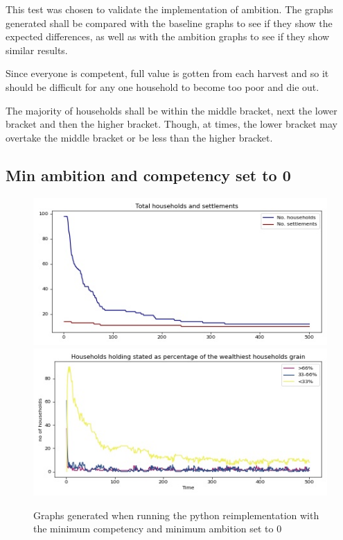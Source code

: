\documentclass[12pt]{article}
\begin{document}
				This test was chosen to validate the implementation of ambition. The graphs generated shall be compared with the baseline graphs to see if they show the expected differences, as well as with the ambition graphs to see if they show similar results.
		
				Since everyone is competent, full value is gotten from each harvest and so it should be difficult for any one household to become too poor and die out.
		
				The majority of households shall be within the middle bracket, next the lower bracket and then the higher bracket. Though, at times, the lower bracket may overtake the middle bracket or be less than the higher bracket.
		
		
		
			\subsection{Min ambition and competency set to 0}
				\begin{figure}[!htb]
				\includegraphics[width=12cm]{Min_ambition_competency_run1_A}\\
				\includegraphics[width=12cm]{Min_ambition_competency_run1_B}
				\caption{Graphs generated when running the python reimplementation with the minimum competency and minimum ambition set to 0}
				\label{fig:Min_ambition_competency_ours_1}
				\end{figure}
				
\end{document}
